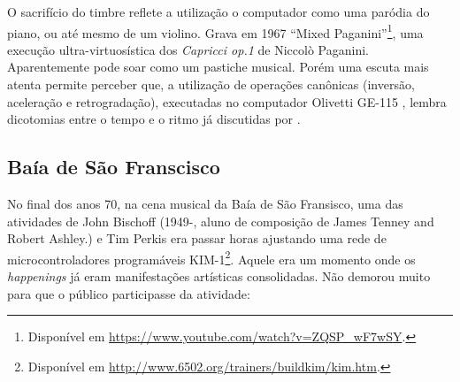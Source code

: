 O sacrifício do timbre reflete a utilização o computador como uma paródia do piano, ou até mesmo de um violino. Grava em 1967 ``Mixed Paganini''\footnote{Disponível em \url{https://www.youtube.com/watch?v=ZQSP_wF7wSY}.}, uma execução ultra-virtuosística dos \emph{Capricci op.1} de Niccolò Paganini. Aparentemente pode soar como um pastiche musical. Porém uma escuta mais atenta permite perceber  que, a utilização de operações canônicas (inversão, aceleração e retrogradação),  executadas no computador Olivetti GE-115 , lembra dicotomias entre o tempo e o ritmo já discutidas por .


\subsection{Baía de São Franscisco}\label{sec:baiasaofranscisco}

No final dos anos 70, na cena musical da Baía de São Fransisco, uma das atividades de John Bischoff (1949-, aluno de composição de James Tenney and Robert Ashley.) e Tim Perkis  era passar horas ajustando uma rede de microcontroladores programáveis KIM-1\footnote{Disponível em \url{http://www.6502.org/trainers/buildkim/kim.htm}.}. Aquele era um momento onde os \emph{happenings} já eram manifestações artísticas consolidadas. Não demorou muito para que o público participasse da atividade:

